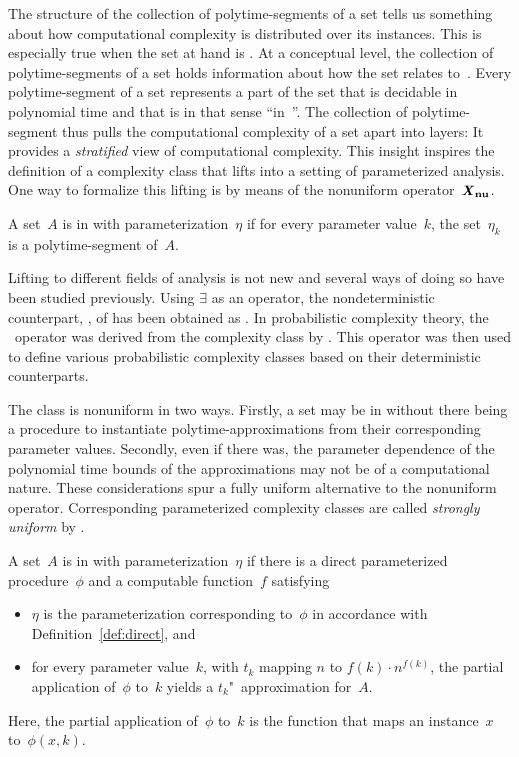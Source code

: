The structure of the collection of polytime-segments of a set tells us something about how computational complexity is distributed over its instances.
This is especially true when the set at hand is .
At a conceptual level, the collection of polytime-segments of a set holds information about how the set relates to~.
Every polytime-segment of a set represents a part of the set that is decidable in polynomial time and that is in that sense \enquote{in~}.
The collection of polytime-segment thus pulls the computational complexity of a set apart into layers:
It provides a \emph{stratified} view of computational complexity.
This insight inspires the definition of a complexity class that lifts  into a setting of parameterized analysis.
One way to formalize this lifting is by means of the nonuniform operator~$\textnormal{\textbf{\textit{X}$_\textbf{nu}$}}$.
\begin{definition}
  A set~$A$ is in  with parameterization~$\eta$ if for every parameter value~$k$, the set~$\eta_k$ is a polytime-segment of~$A$.
\end{definition}

Lifting  to different fields of analysis is not new and several ways of doing so have been studied previously.
Using $\exists$ as an operator, the nondeterministic counterpart, , of  has been obtained as .
In probabilistic complexity theory, the ~operator was derived from the complexity class  by \textcite{schoning1989probabilistic}.
This operator was then used to define various probabilistic complexity classes based on their deterministic counterparts.

The class  is nonuniform in two ways.
Firstly, a set may be in  without there being a procedure to instantiate polytime-approximations from their corresponding parameter values.
Secondly, even if there was, the parameter dependence of the polynomial time bounds of the approximations may not be of a computational nature.
These considerations spur a fully uniform alternative to the nonuniform \clXnu{} operator.
Corresponding parameterized complexity classes are called \emph{strongly uniform} by \textcite{downey1999parameterized}.
\begin{definition}
\label{def:xp}%
  A set~$A$ is in  with parameterization~$\eta$ if there is a direct parameterized procedure~$\phi$ and a computable function~$f$ satisfying
  \begin{itemize}
  \item $\eta$ is the parameterization corresponding to~$\phi$ in accordance with Definition~\ref{def:direct}, and
  \item for every parameter value~$k$, with $t_k$ mapping $n$ to $f(k) \cdot n^{f(k)}$, the partial application of~$\phi$ to~$k$ yields a $t_k$"~approximation for~$A$.
  \end{itemize}
  Here, the partial application of~$\phi$ to~$k$ is the function that maps an instance~$x$ to~$\phi(x, k)$.
\end{definition}

